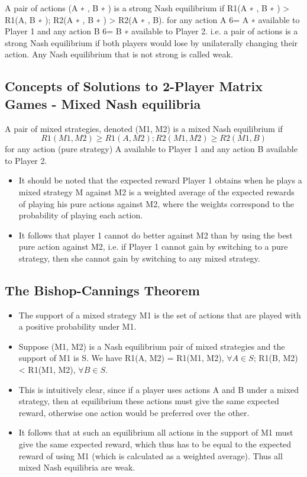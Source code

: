 \documentclass[]{report}
\begin{document}
	A pair of actions (A
	∗
	, B
	∗
	) is a strong Nash equilibrium if
	R1(A
	∗
	, B
	∗
	) > R1(A, B
	∗
	); R2(A
	∗
	, B
	∗
	) > R2(A
	∗
	, B).
	for any action A 6= A
	∗
	available to Player 1 and any action B 6= B
	∗
	available to Player 2.
	i.e. a pair of actions is a strong Nash equilibrium if both players
	would lose by unilaterally changing their action.
	Any Nash equilibrium that is not strong is called weak.
	\subsection{Concepts of Solutions to 2-Player Matrix Games - Mixed
		Nash equilibria}
	A pair of mixed strategies, denoted (M1, M2) is a mixed Nash
	equilibrium if
	\[R1(M1, M2) \geq R1(A, M2); R2(M1, M2) \geq R2(M1, B)\]
	for any action (pure strategy) A available to Player 1 and any
	action B available to Player 2.
	\begin{itemize}
		\item It should be noted that the expected reward Player 1 obtains when
		he plays a mixed strategy M against M2 is a weighted average of
		the expected rewards of playing his pure actions against M2, where
		the weights correspond to the probability of playing each action.
		\item It follows that player 1 cannot do better against M2 than by using
		the best pure action against M2, i.e. if Player 1 cannot gain by
		switching to a pure strategy, then she cannot gain by switching to
		any mixed strategy.
	\end{itemize}
	
	\subsection{The Bishop-Cannings Theorem}
	\begin{itemize}
		\item The support of a mixed strategy M1 is the set of actions that are
		played with a positive probability under M1.
		\item Suppose (M1, M2) is a Nash equilibrium pair of mixed strategies
		and the support of M1 is S. We have
		R1(A, M2) = R1(M1, M2), $\forall A  \in S$; R1(B, M2) < R1(M1, M2), $\forall B  \in S$.
		\item This is intuitively clear, since if a player uses actions A and B
		under a mixed strategy, then at equilibrium these actions must give
		the same expected reward, otherwise one action would be preferred
		over the other.
		\item It follows that at such an equilibrium all actions in the support of
		M1 must give the same expected reward, which thus has to be
		equal to the expected reward of using M1 (which is calculated as a
		weighted average). Thus all mixed Nash equilibria are weak.
	\end{itemize}
	
\end{document}

